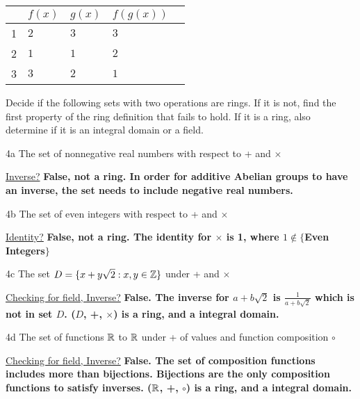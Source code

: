 \begin{tabular}{l|llll}
    & $f(x)$ & $g(x)$ & $f(g(x))$ \\
    \hline
 1  & $2$    & $3$    & $3$ \\
 2  & $1$    & $1$    & $2$ \\
 3  & $3$    & $2$    & $1$ \\
\end{tabular}


\begin{question}{4}
Decide if the following sets with two operations are rings. If it is not, find the first property of the ring definition that fails to hold. If it is a ring, also determine if it is an integral domain or a field.
\end{question}


\begin{question}{4a}
The set of nonnegative real numbers with respect to + and $\times$
\end{question}

\underline{Inverse?} \textbf{False, not a ring. In order for additive Abelian groups to have an inverse, the set needs to include negative real numbers. }

\begin{question}{4b}
The set of even integers with respect to + and $\times$
\end{question}

\underline{Identity?} \textbf{False, not a ring. The identity for $\times$ is 1, where $1 \notin \{$Even Integers$\}$}

\begin{question}{4c}
The set $D = \{x+y\sqrt{2} : x, y \in \mathbb{Z}\}$ under + and $\times$
\end{question}

\underline{Checking for field, Inverse?} \textbf{False. The inverse for $a+b\sqrt{2}$ is $\frac{1}{a+b\sqrt{2}}$ which is not in set $D$. ($D$, +, $\times$) is a ring, and a integral domain.}

\begin{question}{4d}
The set of functions $\mathbb{R}$ to $\mathbb{R}$ under + of values and function composition $\circ$
\end{question}

\underline{Checking for field, Inverse?} \textbf{False. The set of composition functions includes more than bijections. Bijections are the only composition functions to satisfy inverses. ($\mathbb{R}$, +, $\circ$) is a ring, and a integral domain.}


